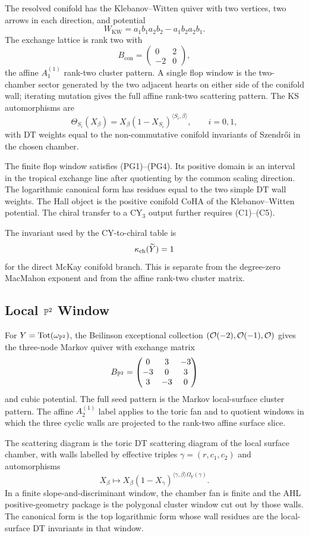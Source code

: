 The resolved conifold has the Klebanov--Witten quiver with two vertices,
two arrows in each direction, and potential
\[
  W_{\mathrm{KW}}
  =
  a_1b_1a_2b_2-a_1b_2a_2b_1.
\]
The exchange lattice is rank two with
\[
  B_{\mathrm{con}}=
  \begin{pmatrix}0&2\\-2&0\end{pmatrix},
\]
the affine $A_1^{(1)}$ rank-two cluster pattern. A single flop window is
the two-chamber sector generated by the two adjacent hearts on either
side of the conifold wall; iterating mutation gives the full affine
rank-two scattering pattern. The KS automorphisms are
\[
  \Theta_{S_i}(X_\beta)
  =
  X_\beta(1-X_{S_i})^{\langle S_i,\beta\rangle},
  \qquad i=0,1,
\]
with DT weights equal to the non-commutative conifold invariants of
Szendr\H{o}i in the chosen chamber.

The finite flop window satisfies (PG1)--(PG4). Its positive domain is an
interval in the tropical exchange line after quotienting by the common
scaling direction. The logarithmic canonical form has residues equal to
the two simple DT wall weights. The Hall object is the positive conifold
CoHA of the Klebanov--Witten potential. The chiral transfer to a
CY$_3$ output further requires (C1)--(C5).

The invariant used by the CY-to-chiral table is
\[
  \kappa_{\mathrm{ch}}(\widetilde Y)=1
\]
for the direct McKay conifold branch. This is separate from the
degree-zero MacMahon exponent and from the affine rank-two cluster
matrix.

\subsection*{Local \texorpdfstring{$\mathbb{P}^2$}{P2} Window}
\label{sec:local-p2-window}

For $Y=\mathrm{Tot}(\omega_{\mathbb{P}^2})$, the Beilinson exceptional
collection $(\mathcal{O}(-2),\mathcal{O}(-1),\mathcal{O})$ gives the three-node Markov quiver
with exchange matrix
\[
  B_{\mathbb{P}^2}=
  \begin{pmatrix}
    0&3&-3\\
    -3&0&3\\
    3&-3&0
  \end{pmatrix}
\]
and cubic potential. The full seed pattern is the Markov local-surface
cluster pattern. The affine $A_2^{(1)}$ label applies to the toric fan
and to quotient windows in which the three cyclic walls are projected
to the rank-two affine surface slice.

The scattering diagram is the toric DT scattering diagram of the local
surface chamber, with walls labelled by effective triples
$\gamma=(r,c_1,c_2)$ and automorphisms
\[
  X_\beta\longmapsto
  X_\beta
  (1-X_\gamma)^{\langle\gamma,\beta\rangle
  \Omega_Y(\gamma)}.
\]
In a finite slope-and-discriminant window, the chamber fan is finite and
the AHL positive-geometry package is the polygonal cluster window cut
out by those walls. The canonical form is the top logarithmic form whose
wall residues are the local-surface DT invariants in that window.

